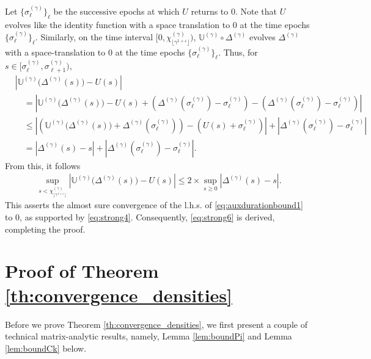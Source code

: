 \documentclass[11pt,leqno]{amsart}
\numberwithin{table}{section}
\numberwithin{figure}{section}
\numberwithin{equation}{section}
\newcommand{\1}{{\mathds{1}}}
\newcommand{\0}{\mat{0}}
\begin{document}
{Let $\{\sigma^{(\gamma)}_\ell\}_{\ell}$ be the successive epochs at which $U$ returns to $0$. Note that $U$ evolves like the identity function with a space translation to $0$ at the time epochs $\{\sigma^{(\gamma)}_\ell\}_{\ell}$. Similarly, on the time interval $[0, \chi^{(\gamma)}_{\lfloor \gamma^{1+\varepsilon}\rfloor})$, $\mathbb{U}^{(\gamma)}\circ\Delta^{(\gamma)}$ evolves $\Delta^{(\gamma)}$ with a space-translation to $0$ at the time epochs $\{\sigma^{(\gamma)}_\ell\}_{\ell}$. Thus, for $s\in [\sigma^{(\gamma)}_\ell, \sigma^{(\gamma)}_{\ell+1})$, 
\begin{align*}
&\left|\mathbb{U}^{(\gamma)}\big(\Delta^{(\gamma)}(s)\big)- U(s)\right|\\
 &\quad = \left|\mathbb{U}^{(\gamma)}\big(\Delta^{(\gamma)}(s)\big)- U(s) + \left(\Delta^{(\gamma)}(\sigma^{(\gamma)}_\ell) - \sigma^{(\gamma)}_\ell\right) - \left(\Delta^{(\gamma)}(\sigma^{(\gamma)}_\ell) - \sigma^{(\gamma)}_\ell\right)\right|\\
 &\quad \le \left|\left(\mathbb{U}^{(\gamma)}\big(\Delta^{(\gamma)}(s)\big)+ \Delta^{(\gamma)}(\sigma^{(\gamma)}_\ell)\right)- \left(U(s) +  \sigma^{(\gamma)}_\ell\right)\right| + \left|\Delta^{(\gamma)}(\sigma^{(\gamma)}_\ell) - \sigma^{(\gamma)}_\ell\right|\\
 &\quad = \left|\Delta^{(\gamma)}(s) - s\right| + \left|\Delta^{(\gamma)}(\sigma^{(\gamma)}_\ell) - \sigma^{(\gamma)}_\ell\right|.
\end{align*}
From this, it follows
\begin{align}
\sup_{s < \chi^{(\gamma)}_{\lfloor \gamma^{1+\varepsilon}\rfloor}}\left|\mathbb{U}^{(\gamma)}\big(\Delta^{(\gamma)}(s)\big)- U(s)\right|\le 2 \times \sup_{s\ge 0}\left|\Delta^{(\gamma)}(s)-s\right|.\label{eq:auxdurationbound1}
\end{align}
This asserts the almost sure convergence of the l.h.s. of \eqref{eq:auxdurationbound1} to $0$, as supported by \eqref{eq:strong4}. Consequently, \eqref{eq:strong6} is derived, completing the proof.
\section{Proof of Theorem \ref{th:convergence_densities}}\label{sec:convergence_densities}
Before we prove Theorem \ref{th:convergence_densities}, we first present a couple of technical matrix-analytic results, namely, Lemma \ref{lem:boundPi} and Lemma \ref{lem:boundCk} below.

}
\end{document}
